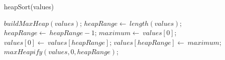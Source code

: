 \documentclass[a4paper,10pt]{article}
\begin{document}
\begin{algorithm}
\caption{heapSort(values)}
\begin{algorithmic}[5]

\STATE {}
\STATE {}
  \STATE \(buildMaxHeap(values)\);
  \STATE \(heapRange\gets\ length(values)\);
    \STATE \(heapRange\gets\ heapRange-1\);
    \STATE \(maximum\gets\ values[0]\);
    \STATE \(values[0]\gets\ values[heapRange]\);
    \STATE \(values[heapRange]\gets\ maximum\);
    \STATE \(maxHeapify(values,0,heapRange)\);
  \ENDFOR

\end{algorithmic}
\end{algorithm}
\end{document}
